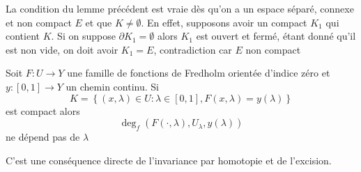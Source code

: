 \documentclass[memoire.tex]{subfiles}
\begin{document}
\begin{remarque}
    La condition du lemme précédent est vraie dès qu'on a un espace séparé, connexe et non compact $E$ et que $K\neq \emptyset$. En effet, supposons avoir un compact $K_1$ qui contient $K$. Si on suppose $\partial K_1=\emptyset$ alors $K_1$ est ouvert et fermé, étant donné qu'il est non vide, on doit avoir $K_1=E$, contradiction car $E$ non compact
\end{remarque}

\begin{lemme}\label{lemme-homo-fred}
    Soit $F:U\rightarrow Y$ une 
    famille de fonctions de 
    Fredholm orientée d'indice 
    zéro et $y:[0,1]\rightarrow Y$ un chemin continu. Si 
    \begin{equation*}
        K=\left\{ (x,\lambda)\in U: \lambda\in [0,1], F(x,\lambda)=y(\lambda)\right\}
    \end{equation*}
    est compact alors 
    \begin{equation*}
        \deg_f(F(\cdot,\lambda),U_{\lambda},y(\lambda))
    \end{equation*}
    ne dépend pas de $\lambda$
\end{lemme}
\begin{preuve}
    C'est une conséquence directe de l'invariance par homotopie et de l'excision.
\end{preuve}
\end{document}
